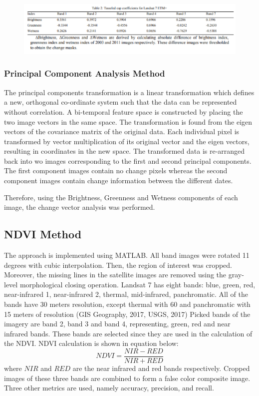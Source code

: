 \documentclass[12pt,a4paper,IEEEtran]{article}
\begin{document}
\begin{figure}[h]
	\centering
	\includegraphics[width=0.7\linewidth]{./tasseledcap}
	\label{fig:tasseledcap}
\end{figure}

\subsubsection[3.4.2]{Principal Component Analysis Method}
The principal components transformation is a linear transformation which defines a new, orthogonal co-ordinate 
system such that the data can be represented without correlation. A bi-temporal feature space is constructed by 
placing the two image vectors in the same space. The transformation is found from the eigen vectors of the 
covariance matrix of the original data. Each individual pixel is transformed by vector multiplication of its original 
vector and the eigen vectors, resulting in coordinates in the new space. The transformed data is re-arranged back into
wo images corresponding to the first and second principal components. The first component images contain no change pixels whereas the second component images contain change information between the different dates.

Therefore, using the Brightness, Greenness and Wetness components of each image, the change vector analysis was performed. 


\subsection[3.5]{NDVI Method}
The approach is implemented using MATLAB. All band 
images were rotated 11 degrees with cubic interpolation. Then, 
the region of interest was cropped. Moreover, the missing lines in the satellite images are removed using 
the gray-level morphological closing operation. 
\newline Landsat 7 has eight bands: blue, green, red, near-infrared 1, 
near-infrared 2, thermal, mid-infrared, panchromatic. All of the 
bands have 30 meters resolution, except thermal with 60 and 
panchromatic with 15 meters of resolution (GIS Geography, 
2017, USGS, 2017)
\newline Picked bands of the imagery are band 2, 
band 3 and band 4, representing, green, red and near infrared 
bands. These bands are selected since they are used in the 
calculation of the NDVI. NDVI calculation is shown in equation below:
\begin{equation}
NDVI = \frac{NIR - RED}{NIR + RED}
\end{equation}
where $NIR$ and $RED$ are the near infrared and red bands respectively.
\newline Cropped images of these three bands are combined to form a 
false color composite image. 
Three other metrics are used, namely accuracy, precision, and recall.
\end{document}
